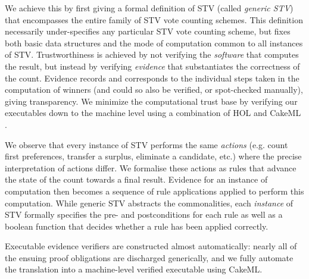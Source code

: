 \documentclass[10pt,conference]{IEEEtran}
\begin{document}

We achieve this by first giving a formal definition of STV (called \emph{generic STV}) 
that  encompasses the entire family of STV vote counting
schemes. This definition necessarily under-specifies any particular STV vote counting scheme, but fixes both basic data structures and the mode of computation common to all instances of STV. Trustworthiness is achieved by
not verifying the \emph{software} that computes the result, but instead by verifying \emph{evidence} that substantiates the correctness of the count. Evidence records and corresponds to the individual steps taken in the computation of winners 
(and could so also be verified, or spot-checked manually), giving transparency. We minimize the computational trust base by verifying our executables down to the machine level using a combination of HOL \cite{hol} and CakeML \cite{cake}. 

We observe that every instance of STV performs the same
\emph{actions} (e.g. count first preferences, transfer a surplus,
eliminate a candidate, etc.) where the precise interpretation of
actions differ. We formalise these actions as rules that advance the state of the count towards a final result. Evidence for an instance of computation then becomes a sequence of rule applications applied to perform this computation. While generic STV abstracts the commonalities, each \emph{instance} of STV formally specifies the
pre- and postconditions for each rule as well as a boolean function that decides whether a rule has been applied correctly. 

Executable evidence verifiers are constructed almost
automatically:  nearly all of the ensuing proof obligations are discharged generically, and we fully automate the translation into a machine-level verified executable using CakeML.
\end{document}
